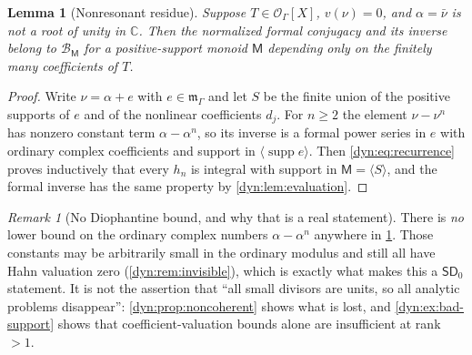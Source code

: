 \documentclass[11pt,letterpaper]{article}
\newtheorem{lemma}[lemma]{Lemma}
\theoremstyle{definition}
\theoremstyle{remark}
\newtheorem{remark}[remark]{Remark}
\newcommand{\C}{\mathbb C}
\newcommand{\OO}{\mathcal O}
\newcommand{\BB}{\mathscr B}
\newcommand{\m}{\mathfrak m}
\newcommand{\supp}{\operatorname{supp}}
\newcommand{\sdz}{\mathsf{SD}_{0}}
\numberwithin{equation}{section}
\begin{document}
\begin{lemma}[Nonresonant residue]\label{dyn:lem:nonresonant}
Suppose $T\in\OO_\Gamma[X]$, $v(\nu)=0$, and $\alpha=\bar\nu$ is \emph{not}
a root of unity in $\C$. Then the normalized formal conjugacy and its
inverse belong to $\BB_{\mathsf M}$ for a positive-support monoid
$\mathsf M$ depending only on the finitely many coefficients of $T$.
\end{lemma}
\begin{proof}
Write $\nu=\alpha+e$ with $e\in\m_\Gamma$ and let $S$ be the finite union
of the positive supports of $e$ and of the nonlinear coefficients $d_j$.
For $n\ge2$ the element $\nu-\nu^{n}$ has nonzero constant term
$\alpha-\alpha^{n}$, so its inverse is a formal power series in $e$ with
ordinary complex coefficients and support in $\langle\supp e\rangle$. Then
\eqref{dyn:eq:recurrence} proves inductively that every $h_n$ is integral
with support in $\mathsf M=\langle S\rangle$, and the formal inverse has
the same property by \cref{dyn:lem:evaluation}.
\end{proof}

\begin{remark}[No Diophantine bound, and why that is a real statement]
\label{dyn:rem:nodiophantine}
There is \emph{no} lower bound on the ordinary complex numbers
$\alpha-\alpha^{n}$ anywhere in \cref{dyn:lem:nonresonant}. Those constants
may be arbitrarily small in the ordinary modulus and still all have Hahn
valuation zero (\cref{dyn:rem:invisible}), which is exactly what makes this
a $\sdz$ statement. It is not the assertion that ``all small divisors are
units, so all analytic problems disappear'': \cref{dyn:prop:noncoherent}
shows what is lost, and \cref{dyn:ex:bad-support} shows that
coefficient-valuation bounds alone are insufficient at rank $>1$.
\end{remark}
\end{document}
